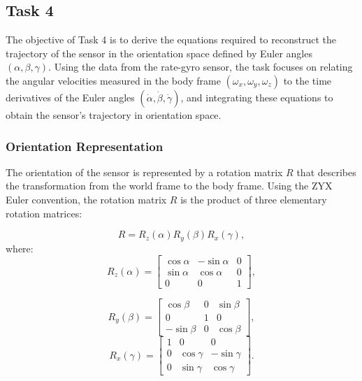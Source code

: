 \documentclass[12pt]{article}
\begin{document}
\subsection{Task 4}

The objective of Task 4 is to derive the equations required to reconstruct the trajectory of the sensor in the orientation space defined by Euler angles \((\alpha, \beta, \gamma)\). Using the data from the rate-gyro sensor, the task focuses on relating the angular velocities measured in the body frame \((\omega_x, \omega_y, \omega_z)\) to the time derivatives of the Euler angles \((\dot{\alpha}, \dot{\beta}, \dot{\gamma})\), and integrating these equations to obtain the sensor's trajectory in orientation space.

\subsubsection{Orientation Representation}

The orientation of the sensor is represented by a rotation matrix \(R\) that describes the transformation from the world frame to the body frame. Using the ZYX Euler convention, the rotation matrix \(R\) is the product of three elementary rotation matrices:

\begin{equation}
\label{eq:R_combined_task4}
R = R_z(\alpha) R_y(\beta) R_x(\gamma),
\end{equation}
where:
\begin{equation}
\label{eq:Rz}
R_z(\alpha) =
\begin{bmatrix}
\cos\alpha & -\sin\alpha & 0 \\
\sin\alpha & \cos\alpha & 0 \\
0 & 0 & 1
\end{bmatrix},
\end{equation}

\begin{equation}
\label{eq:Ry}
R_y(\beta) =
\begin{bmatrix}
\cos\beta & 0 & \sin\beta \\
0 & 1 & 0 \\
-\sin\beta & 0 & \cos\beta
\end{bmatrix}, 
\end{equation}
\begin{equation}
\label{eq:Rx}
R_x(\gamma) =
\begin{bmatrix}
1 & 0 & 0 \\
0 & \cos\gamma & -\sin\gamma \\
0 & \sin\gamma & \cos\gamma
\end{bmatrix}.
\end{equation}
\end{document}
